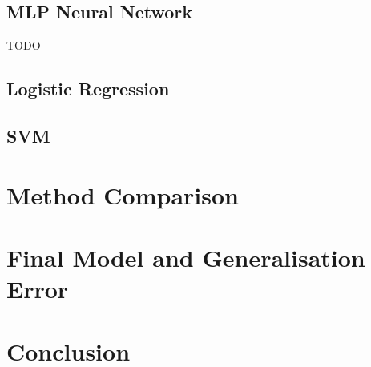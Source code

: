 \documentclass[english]{scrartcl}
\begin{document}
    \subsection{MLP Neural Network}
    TODO
    
    \subsection{Logistic Regression}
    
    \subsection{SVM}

\section{Method Comparison}

\section{Final Model and Generalisation Error}

\section{Conclusion}
\end{document}
